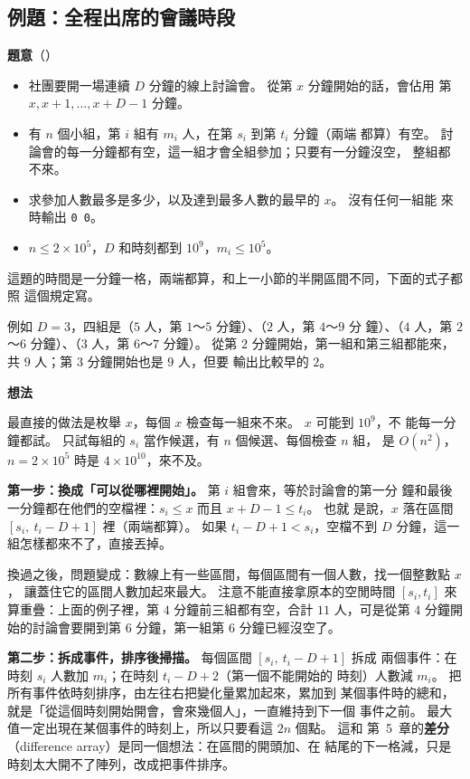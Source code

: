 \subsection{例題：全程出席的會議時段}
\label{sec:ex-meeting}

\textbf{題意}（）

\begin{itemize}
\item 社團要開一場連續 $D$ 分鐘的線上討論會。 從第 $x$ 分鐘開始的話，會佔用
第 $x, x + 1, \ldots, x + D - 1$ 分鐘。
\item 有 $n$ 個小組，第 $i$ 組有 $m_i$ 人，在第 $s_i$ 到第 $t_i$ 分鐘（兩端
都算）有空。 討論會的每一分鐘都有空，這一組才會全組參加；只要有一分鐘沒空，
整組都不來。
\item 求參加人數最多是多少，以及達到最多人數的最早的 $x$。 沒有任何一組能
來時輸出 \texttt{0 0}。
\item $n \le 2 \times 10^5$，$D$ 和時刻都到 $10^9$，$m_i \le 10^5$。
\end{itemize}

這題的時間是一分鐘一格，兩端都算，和上一小節的半開區間不同，下面的式子都照
這個規定寫。

例如 $D = 3$，四組是（$5$ 人，第 $1$～$5$ 分鐘）、（$2$ 人，第 $4$～$9$ 分
鐘）、（$4$ 人，第 $2$～$6$ 分鐘）、（$3$ 人，第 $6$～$7$ 分鐘）。 從第 $2$
分鐘開始，第一組和第三組都能來，共 $9$ 人；第 $3$ 分鐘開始也是 $9$ 人，但要
輸出比較早的 $2$。

\textbf{想法}

最直接的做法是枚舉 $x$，每個 $x$ 檢查每一組來不來。 $x$ 可能到 $10^9$，不
能每一分鐘都試。 只試每組的 $s_i$ 當作候選，有 $n$ 個候選、每個檢查 $n$ 組，
是 $O(n^2)$，$n = 2 \times 10^5$ 時是 $4 \times 10^{10}$，來不及。

\textbf{第一步：換成「可以從哪裡開始」。} 第 $i$ 組會來，等於討論會的第一分
鐘和最後一分鐘都在他們的空檔裡：$s_i \le x$ 而且 $x + D - 1 \le t_i$。 也就
是說，$x$ 落在區間 $[s_i,\ t_i - D + 1]$ 裡（兩端都算）。 如果
$t_i - D + 1 < s_i$，空檔不到 $D$ 分鐘，這一組怎樣都來不了，直接丟掉。

換過之後，問題變成：數線上有一些區間，每個區間有一個人數，找一個整數點 $x$，
讓蓋住它的區間人數加起來最大。 注意不能直接拿原本的空閒時間 $[s_i, t_i]$
來算重疊：上面的例子裡，第 $4$ 分鐘前三組都有空，合計 $11$ 人，可是從第 $4$
分鐘開始的討論會要開到第 $6$ 分鐘，第一組第 $6$ 分鐘已經沒空了。

\textbf{第二步：拆成事件，排序後掃描。} 每個區間 $[s_i,\ t_i - D + 1]$ 拆成
兩個事件：在時刻 $s_i$ 人數加 $m_i$；在時刻 $t_i - D + 2$（第一個不能開始的
時刻）人數減 $m_i$。 把所有事件依時刻排序，由左往右把變化量累加起來，累加到
某個事件時的總和，就是「從這個時刻開始開會，會來幾個人」，一直維持到下一個
事件之前。 最大值一定出現在某個事件的時刻上，所以只要看這 $2n$ 個點。 這和
第~5~章的\textbf{差分}（difference array）是同一個想法：在區間的開頭加、在
結尾的下一格減，只是時刻太大開不了陣列，改成把事件排序。

